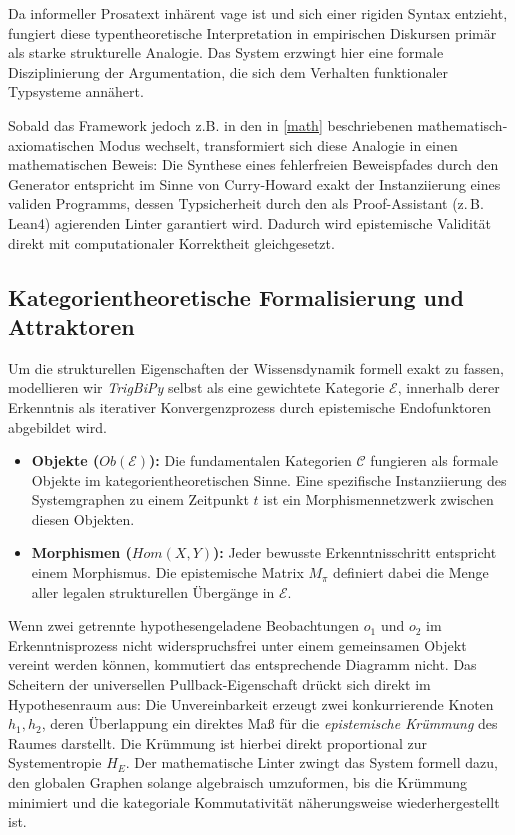 \documentclass[11pt, a4paper]{article}
\begin{document}
	Da informeller Prosatext inhärent vage ist und sich einer rigiden Syntax entzieht, fungiert diese typentheoretische Interpretation in empirischen Diskursen primär als starke strukturelle Analogie. Das System erzwingt hier eine formale Disziplinierung der Argumentation, die sich dem Verhalten funktionaler Typsysteme annähert. 
	
	Sobald das Framework jedoch z.B. in den in \ref{math} beschriebenen mathematisch-axiomatischen Modus wechselt, transformiert sich diese Analogie in einen mathematischen Beweis: Die Synthese eines fehlerfreien Beweispfades durch den Generator entspricht im Sinne von Curry-Howard exakt der Instanziierung eines validen Programms, dessen Typsicherheit durch den als Proof-Assistant (z.\,B. Lean4) agierenden Linter garantiert wird. Dadurch wird epistemische Validität direkt mit computationaler Korrektheit gleichgesetzt.
	
	\subsection{Kategorientheoretische Formalisierung und Attraktoren}
	Um die strukturellen Eigenschaften der Wissensdynamik formell exakt zu fassen, modellieren wir \emph{TrigBiPy} selbst als eine gewichtete Kategorie $\mathcal{E}$, innerhalb derer Erkenntnis als iterativer Konvergenzprozess durch epistemische Endofunktoren abgebildet wird.
	
	\begin{itemize}
		\item \textbf{Objekte ($Ob(\mathcal{E})$):} Die fundamentalen Kategorien $\mathcal{C}$ fungieren als formale Objekte im kategorientheoretischen Sinne. Eine spezifische Instanziierung des Systemgraphen zu einem Zeitpunkt $t$ ist ein Morphismennetzwerk zwischen diesen Objekten.
		\item \textbf{Morphismen ($Hom(X, Y)$):} Jeder bewusste Erkenntnisschritt entspricht einem Morphismus. Die epistemische Matrix $M_\pi$ definiert dabei die Menge aller legalen strukturellen Übergänge in $\mathcal{E}$.
	\end{itemize}
	
	Wenn zwei getrennte hypothesengeladene Beobachtungen $o_1$ und $o_2$ im Erkenntnisprozess nicht widerspruchsfrei unter einem gemeinsamen Objekt vereint werden können, kommutiert das entsprechende Diagramm nicht. Das Scheitern der universellen Pullback-Eigenschaft drückt sich direkt im Hypothesenraum aus: Die Unvereinbarkeit erzeugt zwei konkurrierende Knoten $h_1, h_2$, deren Überlappung ein direktes Maß für die \emph{epistemische Krümmung} des Raumes darstellt. Die Krümmung ist hierbei direkt proportional zur Systementropie $H_E$. Der mathematische Linter zwingt das System formell dazu, den globalen Graphen solange algebraisch umzuformen, bis die Krümmung minimiert und die kategoriale Kommutativität näherungsweise wiederhergestellt ist.
	
\end{document}
